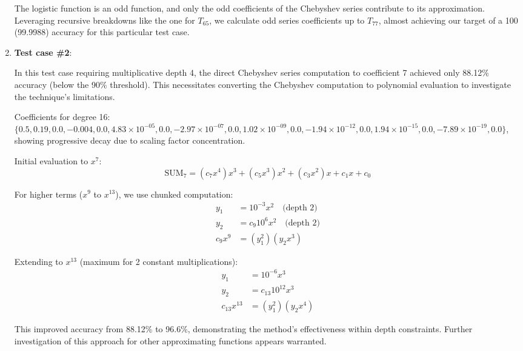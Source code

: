 \documentclass[article]{iacrtrans}
\begin{document}
\begin{enumerate}
The logistic function is an odd function, and only the odd coefficients of the Chebyshev series contribute to its approximation. Leveraging recursive breakdowns like the one for  $T_{65}$, we calculate odd series coefficients up to  $T_{77}$, almost achieving our target of a 100 (99.9988) accuracy for this particular test case.

\item \textbf {Test case \#2}:

    In this test case requiring multiplicative depth 4, the direct Chebyshev series computation to coefficient 7 achieved only 88.12\% accuracy (below the 90\% threshold). This necessitates converting the Chebyshev computation to polynomial evaluation to investigate the technique's limitations.
    
    Coefficients for degree 16: 
    $\{0.5, 0.19, 0.0, -0.004, 0.0, 4.83\times10^{-05}, 0.0, -2.97\times10^{-07}, 0.0, 1.02\times10^{-09}, 0.0, -1.94\times10^{-12}, 0.0, 1.94\times10^{-15}, 0.0, -7.89\times10^{-19}, 0.0\}$, showing progressive decay due to scaling factor concentration.

    Initial evaluation to $x^7$:
    \begin{equation*}
        \mathrm{SUM}_7 = (c_7 x^4)x^3 + (c_5 x^3)x^2 + (c_3 x^2)x + c_1 x + c_0
    \end{equation*}
    
    For higher terms ($x^9$ to $x^{13}$), we use chunked computation:
    \begin{align*}
        y_1 &= 10^{-3}x^2 \quad \text{(depth 2)} \\
        y_2 &= c_9 10^6 x^2 \quad \text{(depth 2)} \\
        c_9x^9 &= (y_1^2)(y_2x^3)
    \end{align*}
    
    Extending to $x^{13}$ (maximum for 2 constant multiplications):
    \begin{align*}
        y_1 &= 10^{-6}x^3 \\
        y_2 &= c_{13} 10^{12}x^3 \\
        c_{13}x^{13} &= (y_1^2)(y_2x^4)
    \end{align*}

    This improved accuracy from 88.12\% to 96.6\%, demonstrating the method's effectiveness within depth constraints. Further investigation of this approach for other approximating functions appears warranted.

\end{enumerate}
\end{document}
